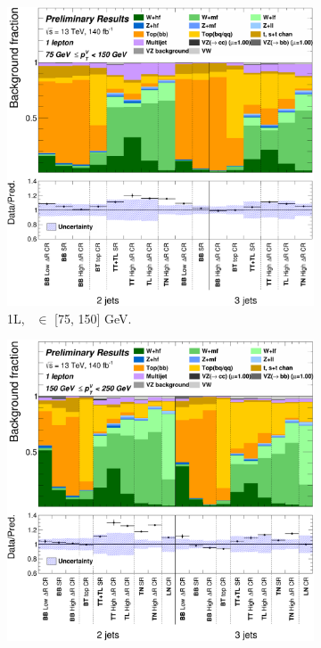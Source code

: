 \begin{figure}[h!]
{\begin{subfigure}[b]{0.38\textwidth}
            \includegraphics[width=\textwidth]{Images/VH/Own_fit/backCom_uncPrefit/GlobalFit_unconditional__Prefit/C_SRCRs_L1_BMax150_BMin75.png}
            \caption{1L, \ptv\ $\in$ [75, 150] GeV.}
            \label{fig:backCom_1L_1}
        \end{subfigure}
        \begin{subfigure}[b]{0.38\textwidth}
            \centering
            \includegraphics[width=\textwidth]{Images/VH/Own_fit/backCom_uncPrefit/GlobalFit_unconditional__Prefit/C_SRCRs_L1_BMax250_BMin150.png}

\end{subfigure}}
\end{figure}
